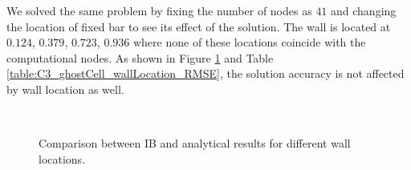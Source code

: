 We solved the same problem by fixing the number of nodes as $41$ and changing the location of fixed bar to see its effect of the solution. The wall is located at $0.124$, $0.379$, $0.723$, $0.936$ where none of these locations coincide with the computational nodes. As shown in Figure \ref{fig:C3_ghostCell_wallLocation} and Table \ref{table:C3_ghostCell_wallLocation_RMSE}, the solution accuracy is not affected by wall location as well.

\begin{figure}[H]
	\centering
	\quad
	\\
	\quad
	\caption{Comparison between IB and analytical results for different wall locations.}
	\label{fig:C3_ghostCell_wallLocation}
\end{figure}

